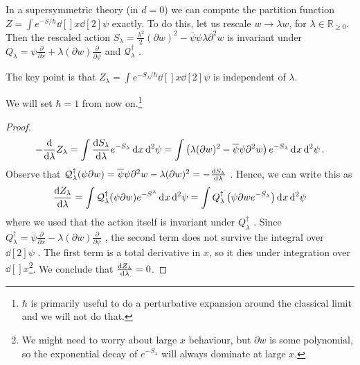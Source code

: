 In a supersymmetric theory (in $d = 0$) we can compute the partition function $Z = \int e^{-S / \hbar} \dd[]{x} \dd[2]{\psi}$ exactly.
To do this, let us rescale $w \to \lambda w$, for $\lambda \in \mathbb{R}_{\geq 0}$.
Then the rescaled action $S_{\lambda} = \frac{\lambda^2}{2} (\partial w)^2 - \overline{\psi} \psi \lambda \partial^2 w$ is invariant under $Q_{\lambda} = \psi \frac{\partial }{\partial x} + \lambda ( \partial w) \frac{\partial }{\partial \overline{\psi}}$  and $\mathcal{Q}^{\dagger}_{\lambda}$ .
\begin{claim}
  The key point is that $Z_{\lambda} = \int e^{-S_{\lambda} / \hbar} \dd[]{x} \dd[2]{\psi}$ is independent of $\lambda$.
\end{claim}
\begin{leftbar}
  We will set $\hbar = 1$ from now on.\footnote{$\hbar$ is primarily useful to do a perturbative expansion around the classical limit and we will not do that.}
\end{leftbar}
\begin{proof}
  \begin{equation}
    -\dv{}{\lambda} Z_{\lambda} = \int \dv{S_{\lambda}}{\lambda} e^{-S_{\lambda}} \dd[]{x} \dd[2]{\psi} = \int \left( \lambda (\partial w)^2 - \overline{\psi} \psi \partial^2 w \right) e^{-S_\lambda} \dd[]{x} \dd[2]{\psi}.
  \end{equation}
  Observe that $\mathcal{Q}^{\dagger}_{\lambda}(\psi \partial w)= \overline{\psi} \psi \partial^2 w - \lambda(\partial w)^2 = - \dv{S_{\lambda}}{\lambda}$ .
  Hence, we can write this as
  \begin{equation}
    \dv{Z_{\lambda}}{\lambda} = \int \mathcal{Q}^{\dagger}_{\lambda} (\psi \partial w) e^{-S^{\lambda}} \dd[]{x} \dd[2]{\psi} = \int Q^{\dagger}_{\lambda} \left( \psi \partial w e^{-S_\lambda} \right) \dd[]{x} \dd[2]{\psi}
  \end{equation}
  where we used that the action itself is invariant under $Q_{\lambda}^{\dagger}$ .
  Since $Q^{\dagger}_{\lambda} = \overline{\psi} \frac{\partial }{\partial x} - \lambda (\partial w) \frac{\partial }{\partial \psi}$ , the second term does not survive the integral over $\dd[2]{\psi}$ .
  The first term is a total derivative in $x$, so it dies under integration over $\dd[]{x}$\footnote{We might need to worry about large $x$ behaviour, but $\partial w$ is some polynomial, so the exponential decay of $e^{-S_{\lambda}}$ will always dominate at large $x$.}.
  We conclude that $\dv{Z_{\lambda}}{\lambda} = 0$. 
\end{proof}

